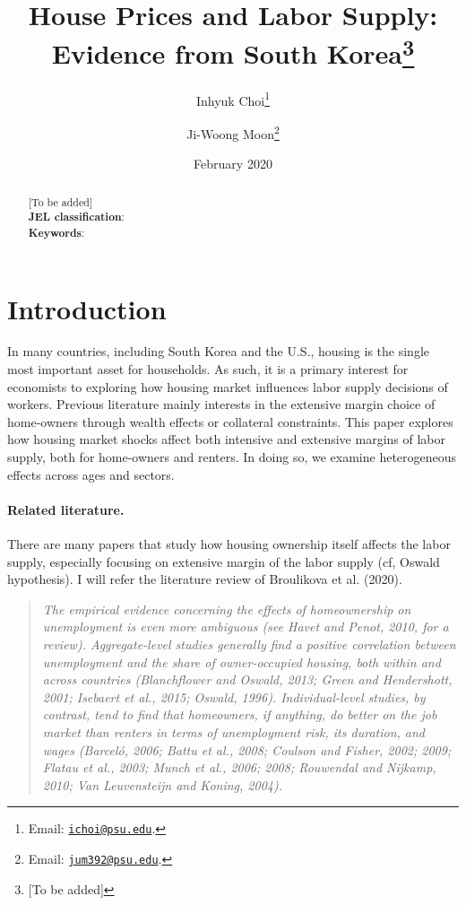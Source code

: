 \documentclass[10pt]{article}
\title{House Prices and Labor Supply: Evidence from South Korea\thanks{[To be added]}}
\author{
    Inhyuk Choi\thanks{Email: \texttt{\href{mailto:ichoi@psu.edu}{ichoi@psu.edu}}.}
    \and
    Ji-Woong Moon\thanks{Email: \texttt{\href{mailto:jum392@psu.edu}{jum392@psu.edu}}.}
    }
\date{February 2020}
\theoremstyle{definition}
\theoremstyle{remark}
\begin{document}
\maketitle

\begin{abstract}
    [To be added] \\
    \textbf{JEL classification}: \\
    \textbf{Keywords}: 
\end{abstract}

\newpage

\section{Introduction}\label{sec:intro}
In many countries, including South Korea and the U.S., housing is the single most important asset for households. As such, it is a primary interest for economists to exploring how housing market influences labor supply decisions of workers. Previous literature mainly interests in the extensive margin choice of home-owners through wealth effects or collateral constraints. This paper explores how housing market shocks affect both intensive and extensive margins of labor supply, both for home-owners and renters. In doing so, we examine heterogeneous effects across ages and sectors.

\paragraph{Related literature.} There are many papers that study how housing ownership itself affects the labor supply, especially focusing on extensive margin of the labor supply (cf, Oswald hypothesis). I will refer the literature review of Broulikova et al. (2020).

\begin{quote}
    \textit{The empirical evidence concerning the effects of homeownership on unemployment is even more ambiguous (see Havet and Penot, 2010, for a review). Aggregate-level studies generally find a positive correlation between unemployment and the share of owner-occupied housing, both within and across countries (Blanchflower and Oswald, 2013; Green and Hendershott, 2001; Isebaert et al., 2015; Oswald, 1996). Individual-level studies, by contrast, tend to find that homeowners, if anything, do better on the job market than renters in terms of unemployment risk, its duration, and wages (Barceló, 2006; Battu et al., 2008; Coulson and Fisher, 2002; 2009; Flatau et al., 2003; Munch et al., 2006; 2008; Rouwendal and Nijkamp, 2010; Van Leuvensteijn and Koning, 2004).}
\end{quote}
\end{document}
